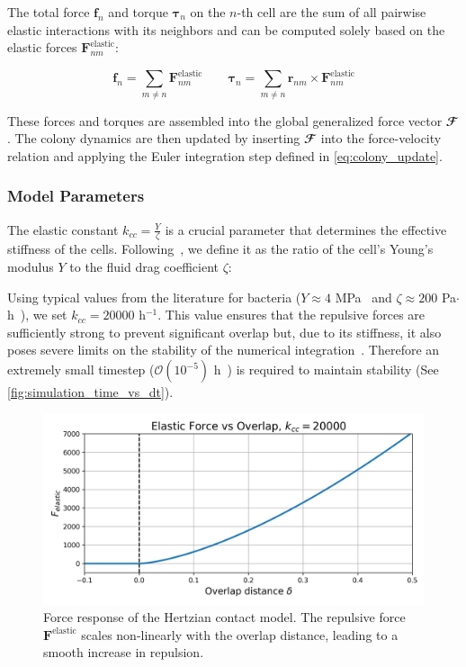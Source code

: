 \documentclass[conference]{IEEEtran}
\begin{document}
The total force $\mathbf{f}_n$ and torque $\boldsymbol{\tau}_n$ on the $n$-th cell are the sum of all pairwise elastic interactions with its neighbors and can be computed solely based on the elastic forces $\mathbf{F}^{\text{elastic}}_{nm}$:

\begin{equation}
    \mathbf{f}_n         = \sum_{m \neq n} \mathbf{F}^{\text{elastic}}_{nm} \qquad
    \boldsymbol{\tau}_n  = \sum_{m \neq n} \mathbf{r}_{nm} \times \mathbf{F}^{\text{elastic}}_{nm}
\end{equation}

These forces and torques are assembled into the global generalized force vector $\mathbfcal{F}$. The colony dynamics are then updated by inserting $\mathbfcal{F}$ into the force-velocity relation and applying the Euler integration step defined in \autoref{eq:colony_update}.

\subsubsection{Model Parameters}

The elastic constant $k_{cc} = \frac{Y}{\zeta}$ is a crucial parameter that determines the effective stiffness of the cells. Following~\cite{You2018}, we define it as the ratio of the cell's Young's modulus $Y$ to the fluid drag coefficient $\zeta$:

Using typical values from the literature for bacteria ($Y \approx 4$ MPa~\cite{You2018, Blanchard2015} and $\zeta \approx 200$ Pa$\cdot$h~\cite{You2018}), we set $k_{cc} = 20000$ h$^{-1}$. This value ensures that the repulsive forces are sufficiently strong to prevent significant overlap but, due to its stiffness, it also poses severe limits on the stability of the numerical integration~\cite{Yan2022}. Therefore an extremely small timestep ($\mathcal{O}(10^{-5})$ h~\cite{Khan_2024, You2018, Blanchard2015}) is required to maintain stability (See \autoref{fig:simulation_time_vs_dt}).

\begin{figure}[H]
    \centering
    \includegraphics[width=\linewidth]{figures/hertzian_contact_model.png}
    \caption{Force response of the Hertzian contact model. The repulsive force $\mathbf{F}^{\text{elastic}}$ scales non-linearly with the overlap distance, leading to a smooth increase in repulsion.}
    \label{fig:hertzian_contact_model}
\end{figure}
\end{document}
